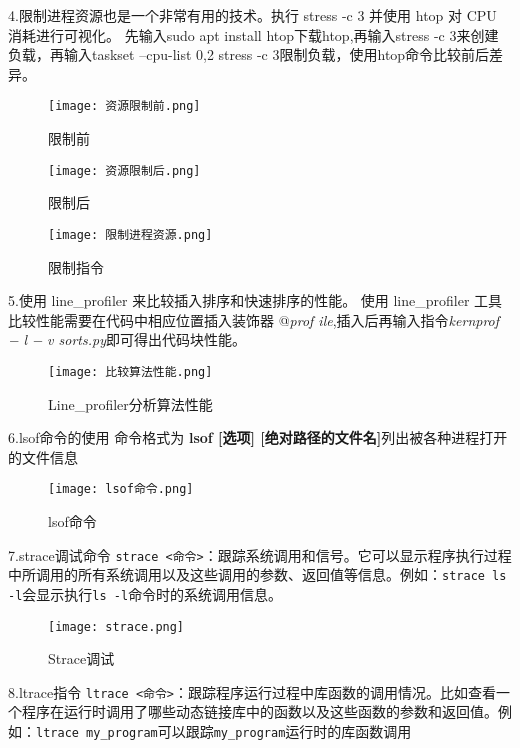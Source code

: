 \documentclass{article}
\begin{document}
4.限制进程资源也是一个非常有用的技术。执行 stress -c 3 并使用 htop 对 CPU 消耗进行可视化。
先输入sudo apt install htop下载htop,再输入stress -c 3来创建负载，再输入taskset --cpu-list 0,2 stress -c 3限制负载，使用htop命令比较前后差异。\newpage
 \begin{figure}[!h]
     \centering
     \texttt{[image: 资源限制前.png]}
     \caption{限制前}
     \label{fig:enter-label}
 \end{figure}
 \begin{figure}[!h]
     \centering
     \texttt{[image: 资源限制后.png]}
     \caption{限制后}
     \label{fig:enter-label}
 \end{figure}
 \begin{figure}[!h]
     \centering
     \texttt{[image: 限制进程资源.png]}
     \caption{限制指令}
     \label{fig:enter-label}
 \end{figure}
5.使用 line\_profiler 来比较插入排序和快速排序的性能。\newline
使用 line\_profiler 工具比较性能需要在代码中相应位置插入装饰器 @\textit{prof ile},插入后再输入指令\textit{kernprof }\textit{− }\textit{l }\textit{− }\textit{v sorts.py}即可得出代码块性能。\newpage
\begin{figure}[!h]
    \centering
    \texttt{[image: 比较算法性能.png]}
    \caption{Line\_profiler分析算法性能}
    \label{fig:enter-label}
\end{figure}
6.lsof命令的使用
命令格式为 \textbf{lsof [选项] [绝对路径的文件名]}列出被各种进程打开的文件信息 
\begin{figure}[!h]
    \centering
    \texttt{[image: lsof命令.png]}
    \caption{lsof命令}
    \label{fig:enter-label}
\end{figure}
\newline
7.strace调试命令
\verb|strace <命令>|：跟踪系统调用和信号。它可以显示程序执行过程中所调用的所有系统调用以及这些调用的参数、返回值等信息。例如：\verb|strace ls -l|会显示执行\verb|ls -l|命令时的系统调用信息。
 \begin{figure}[!h]
     \centering
     \texttt{[image: strace.png]}
     \caption{Strace调试}
     \label{fig:enter-label}
 \end{figure}
 \newline
8.ltrace指令
\verb|ltrace <命令>|：跟踪程序运行过程中库函数的调用情况。比如查看一个程序在运行时调用了哪些动态链接库中的函数以及这些函数的参数和返回值。例如：\verb|ltrace my_program|可以跟踪\verb|my_program|运行时的库函数调用 \newpage
\end{document}
